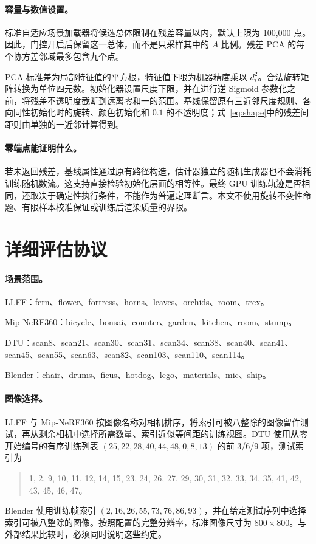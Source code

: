 \documentclass{article}
\begin{document}
\paragraph{容量与数值设置。}
标准自适应场景加载器将候选总体限制在残差容量以内，默认上限为 100,000 点。因此，门控开启后保留这一总体，而不是只采样其中的 $A$ 比例。残差 PCA 的每个协方差邻域最多包含九个点。

PCA 标准差为局部特征值的平方根，特征值下限为机器精度乘以 $d_i^2$。合法旋转矩阵转换为单位四元数。初始化器设置尺度下限，并在进行逆 Sigmoid 参数化之前，将残差不透明度截断到远离零和一的范围。基线保留原有三近邻尺度规则、各向同性初始化时的旋转、颜色初始化和 $0.1$ 的不透明度；式~\eqref{eq:shape}中的残差间距则由单独的一近邻计算得到。

\paragraph{零端点能证明什么。}
若未返回残差，基线属性通过原有路径构造，估计器独立的随机生成器也不会消耗训练随机数流。这支持直接检验初始化层面的相等性。最终 GPU 训练轨迹是否相同，还取决于确定性执行条件，不能作为普遍定理断言。本文不使用旋转不变性命题、有限样本校准保证或训练后渲染质量的界限。

\section{详细评估协议}
\label{app:protocol}

\paragraph{场景范围。}
LLFF：fern、flower、fortress、horns、leaves、orchids、room、trex。

Mip-NeRF360：bicycle、bonsai、counter、garden、kitchen、room、stump。

DTU：scan8、scan21、scan30、scan31、scan34、scan38、scan40、scan41、scan45、scan55、scan63、scan82、scan103、scan110、scan114。

Blender：chair、drums、ficus、hotdog、lego、materials、mic、ship。

\paragraph{图像选择。}
LLFF 与 Mip-NeRF360 按图像名称对相机排序，将索引可被八整除的图像留作测试，再从剩余相机中选择所需数量、索引近似等间距的训练视图。DTU 使用从零开始编号的有序训练列表 $(25,22,28,40,44,48,0,8,13)$ 的前 3/6/9 项，测试索引为
\begin{quote}\small
1, 2, 9, 10, 11, 12, 14, 15, 23, 24, 26, 27, 29, 30, 31, 32, 33, 34, 35, 41, 42, 43, 45, 46, 47。
\end{quote}
Blender 使用训练帧索引 $(2,16,26,55,73,76,86,93)$，并在给定测试序列中选择索引可被八整除的图像。按照配置的完整分辨率，标准图像尺寸为 $800\times800$。与外部结果比较时，必须同时说明这些约定。
\end{document}

